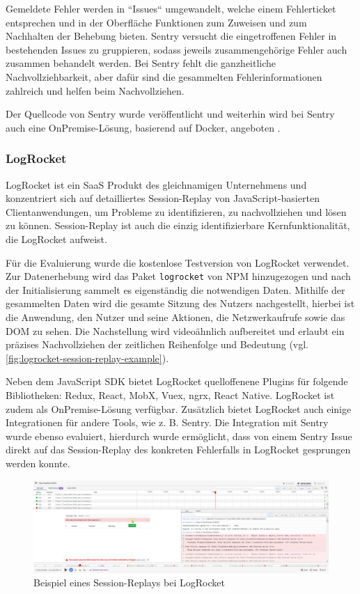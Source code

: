 Gemeldete Fehler werden in ``Issues`` umgewandelt, welche einem Fehlerticket entsprechen und in der Oberfläche Funktionen zum Zuweisen und zum Nachhalten der Behebung bieten. Sentry versucht die eingetroffenen Fehler in bestehenden Issues zu gruppieren, sodass jeweils zusammengehörige Fehler auch zusammen behandelt werden. Bei Sentry fehlt die ganzheitliche Nachvollziehbarkeit, aber dafür sind die gesammelten Fehlerinformationen zahlreich und helfen beim Nachvollziehen.

Der Quellcode von Sentry wurde veröffentlicht und weiterhin wird bei Sentry auch eine OnPremise-Lösung, basierend auf Docker, angeboten \cite{SentrySelfHosted}.

\subsubsection{LogRocket}

LogRocket \cite{LogRocket} ist ein SaaS Produkt des gleichnamigen Unternehmens und konzentriert sich auf detailliertes Session-Replay von JavaScript-basierten Clientanwendungen, um Probleme zu identifizieren, zu nachvollziehen und lösen zu können. Session-Replay ist auch die einzig identifizierbare Kernfunktionalität, die LogRocket aufweist.

Für die Evaluierung wurde die kostenlose Testversion von LogRocket verwendet. Zur Datenerhebung wird das Paket \texttt{logrocket} von NPM hinzugezogen und nach der Initialisierung sammelt es eigenständig die notwendigen Daten. Mithilfe der gesammelten Daten wird die gesamte Sitzung des Nutzers nachgestellt, hierbei ist die Anwendung, den Nutzer und seine Aktionen, die Netzwerkaufrufe sowie das DOM zu sehen. Die Nachstellung wird videoähnlich aufbereitet und erlaubt ein präzises Nachvollziehen der zeitlichen Reihenfolge und Bedeutung (vgl. \autoref{fig:logrocket-session-replay-example}).

Neben dem JavaScript SDK bietet LogRocket quelloffenene Plugins für folgende Bibliotheken: Redux, React, MobX, Vuex, ngrx, React Native. LogRocket ist zudem als OnPremise-Lösung verfügbar. Zusätzlich bietet LogRocket auch einige Integrationen für andere Tools, wie z. B. Sentry. Die Integration mit Sentry wurde ebenso evaluiert, hierdurch wurde ermöglicht, dass von einem Sentry Issue direkt auf das Session-Replay des konkreten Fehlerfalls in LogRocket gesprungen werden konnte.

\begin{figure}[H]
	\centering
	\includegraphics[width=\linewidth]{img/03_methoden/logrocket_session-replay-example.png}
	\caption{Beispiel eines Session-Replays bei LogRocket}
	\label{fig:logrocket-session-replay-example}
\end{figure}

